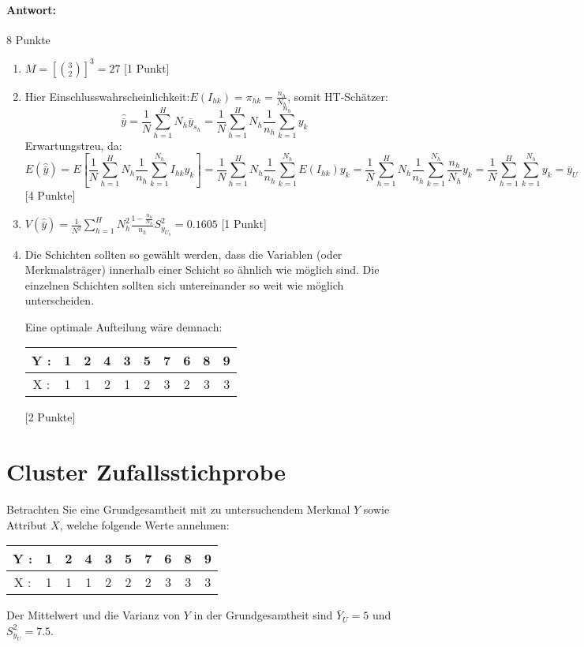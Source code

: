 \documentclass{article}
\begin{document}
\paragraph{Antwort:}
\begin{solution} 8 Punkte
	\begin{enumerate}
		\item $M=\left[\binom{3}{2}\right]^3=27$ [1 Punkt]
		\item Hier Einschlusswahrscheinlichkeit:$E(I_{hk})=\pi_{hk} = \frac{n_h}{N_h}$, somit HT-Schätzer: 
		$$\hat{\bar{y}}=\frac{1}{N} \sum_{h=1}^H N_h \bar{y}_{s_h} = \frac{1}{N} \sum_{h=1}^H N_h \frac{1}{n_h} \sum_{k=1}^{n_h} y_k $$
		Erwartungstreu, da:
		$$E(\hat{\bar{y}}) = E[\frac{1}{N} \sum_{h=1}^H N_h \frac{1}{n_h} \sum_{k=1}^{N_h} I_{hk} y_k ] = \frac{1}{N} \sum_{h=1}^H N_h \frac{1}{n_h} \sum_{k=1}^{N_h} E(I_{hk}) y_k = \frac{1}{N} \sum_{h=1}^H N_h \frac{1}{n_h} \sum_{k=1}^{N_h} \frac{n_h}{N_h} y_k = \frac{1}{N}\sum_{h=1}^H \sum_{k=1}^{N_h} y_k	=\bar{y}_U$$ [4 Punkte]
		\item $V(\hat{\bar{y}})= \frac{1}{N^2} \sum_{h=1}^H N_h^2 \frac{1-\frac{n_h}{N_h}}{n_h} S_{y_{U_h}}^2 = 0.1605$ [1 Punkt]
		\item Die Schichten sollten so gewählt werden, dass die Variablen (oder Merkmalsträger) innerhalb einer Schicht so ähnlich wie möglich sind. Die einzelnen Schichten sollten sich untereinander so weit wie möglich unterscheiden.
		
		Eine optimale Aufteilung wäre demnach:
		\begin{center}
			\begin{tabular}{c|c|c|c|c|c|c|c|c|c}	 
				Y : & 1 & 2 & 4 & 3 & 5 & 7 & 6 & 8 & 9 \\ 
				\hline 
				X : & 1 & 1 & 2 & 1 & 2 & 3 & 2 & 3 & 3 
			\end{tabular} 
		\end{center}
		 [2 Punkte]
	\end{enumerate}
\end{solution}
\newpage


\section{Cluster Zufallsstichprobe}
Betrachten Sie eine Grundgesamtheit mit zu untersuchendem Merkmal $Y$ sowie Attribut $X$, welche folgende Werte annehmen:
\begin{center}
	\begin{tabular}{c|c|c|c|c|c|c|c|c|c}	 
		Y : & 1 & 2 & 4 & 3 & 5 & 7 & 6 & 8 & 9 \\ 
		\hline 
		X : & 1 & 1 & 1 & 2 & 2 & 2 & 3 & 3 & 3 
	\end{tabular} 
\end{center}
Der Mittelwert und die Varianz von $Y$ in der Grundgesamtheit sind $\bar{Y}_U=5$ und $S_{y_U}^2=7.5$. 
\end{document}
